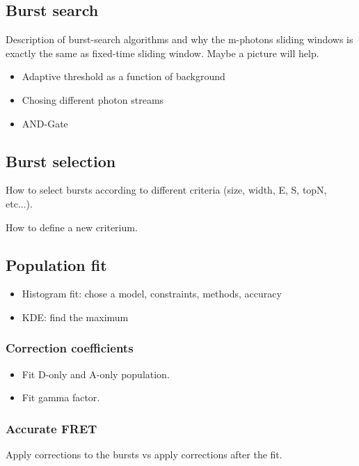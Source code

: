 \subsection{Burst search}
\label{sec:burstsearch}

Description of burst-search algorithms and why the m-photons sliding windows is exactly the same as fixed-time sliding window. Maybe a picture will help.

\begin{itemize}
\item Adaptive threshold as a function of background
\item Chosing different photon streams
\item AND-Gate
\end{itemize}

\subsection{Burst selection}

How to select bursts according to different criteria (size, width, E, S, topN, etc...).

How to define a new criterium.


\subsection{Population fit}

\begin{itemize}
\item Histogram fit: chose a model, constraints, methods, accuracy
\item KDE: find the maximum
\end{itemize}

\subsubsection{Correction coefficients}

\begin{itemize}
\item Fit D-only and A-only population.
\item Fit gamma factor.
\end{itemize}


\subsubsection{Accurate FRET}

Apply corrections to the bursts vs apply corrections after the fit.

